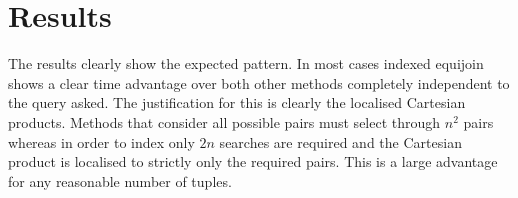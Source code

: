 \section{Results}
The results clearly show the expected pattern. In most cases indexed equijoin
shows a clear time advantage over both other methods completely independent to
the query asked. The justification for this is clearly the localised Cartesian
products. Methods that consider all possible pairs must select through $n^2$
pairs whereas in order to index only $2n$ searches are required and the
Cartesian product is localised to strictly only the required pairs. This is a
large advantage for any reasonable number of tuples.

